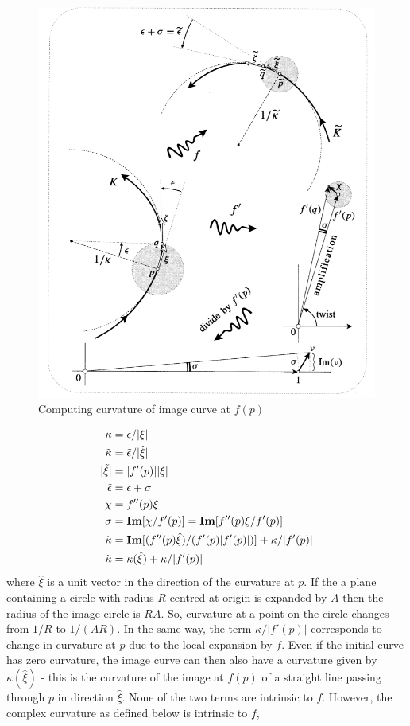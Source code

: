 \documentclass[12pt]{article}
\def\mf{\ensuremath\mathbf}
\def\td{\ensuremath\tilde}
\begin{document}
\begin{enumerate}
\begin{figure}[h!]
            \includegraphics[scale=0.75]{curvature}
            \caption{Computing curvature of image curve at $f(p)$}
            \label{fig:fig_7}
        \end{figure}
        \begin{align*}
            \kappa &= \epsilon/|\xi|\\
            \td{\kappa} &= \td{\epsilon}/|\td{\xi}|\\
            |\td{\xi}| &= |f'(p)||\xi|\\
            \td{\epsilon} &= \epsilon + \sigma\\
            \chi &= f''(p) \xi\\
            \sigma &= \mf{Im}[\chi/f'(p)] = \mf{Im}[f''(p)\xi/f'(p)]\\
            \td{\kappa} &= \mf{Im}[(f''(p)\hat{\xi})/(f'(p)|f'(p)|)] + \kappa/|f'(p)|\\
            \td{\kappa} &= \kappa(\hat{\xi}) + \kappa/|f'(p)|
        \end{align*}
        where $\hat{\xi}$ is a unit vector in the direction of the curvature at $p$. If the a plane containing a circle with radius $R$ centred at origin is expanded by $A$ then the radius of the image circle is $RA$. So, curvature at a point on the circle changes from $1/R$ to $1/(AR)$. In the same way, the term $\kappa/|f'(p)|$ corresponds to change in curvature at $p$ due to the local expansion by $f$. Even if the initial curve has zero curvature, the image curve can then also have a curvature given by $\kappa(\hat{\xi})$ - this is the curvature of the image at $f(p)$ of a straight line passing through $p$ in direction $\hat{\xi}$. None of the two terms are intrinsic to $f$. However, the complex curvature as defined below is intrinsic to $f$,

\end{enumerate}
\end{document}
